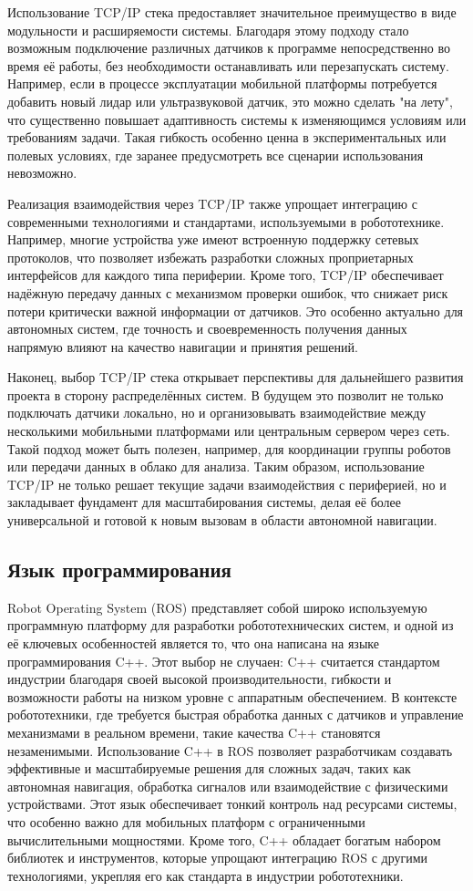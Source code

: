 Использование TCP/IP стека предоставляет значительное преимущество в виде
модульности и расширяемости системы. Благодаря этому подходу стало возможным
подключение различных датчиков к программе непосредственно во время её работы,
без необходимости останавливать или перезапускать систему. Например, если в
процессе эксплуатации мобильной платформы потребуется добавить новый лидар или
ультразвуковой датчик, это можно сделать "на лету", что существенно повышает
адаптивность системы к изменяющимся условиям или требованиям задачи. Такая
гибкость особенно ценна в экспериментальных или полевых условиях, где заранее
предусмотреть все сценарии использования невозможно.

Реализация взаимодействия через TCP/IP также упрощает интеграцию с современными
технологиями и стандартами, используемыми в робототехнике. Например, многие
устройства уже имеют встроенную поддержку сетевых протоколов, что позволяет
избежать разработки сложных проприетарных интерфейсов для каждого типа
периферии. Кроме того, TCP/IP обеспечивает надёжную передачу данных с механизмом
проверки ошибок, что снижает риск потери критически важной информации от
датчиков. Это особенно актуально для автономных систем, где точность и
своевременность получения данных напрямую влияют на качество навигации и
принятия решений.

Наконец, выбор TCP/IP стека открывает перспективы для дальнейшего развития
проекта в сторону распределённых систем. В будущем это позволит не только
подключать датчики локально, но и организовывать взаимодействие между
несколькими мобильными платформами или центральным сервером через сеть. Такой
подход может быть полезен, например, для координации группы роботов или передачи
данных в облако для анализа. Таким образом, использование TCP/IP не только
решает текущие задачи взаимодействия с периферией, но и закладывает фундамент
для масштабирования системы, делая её более универсальной и готовой к новым
вызовам в области автономной навигации.

\subsection{Язык программирования}
Robot Operating System (ROS) представляет собой широко используемую программную
платформу для разработки робототехнических систем, и одной из её ключевых
особенностей является то, что она написана на языке программирования C++. Этот
выбор не случаен: C++ считается стандартом индустрии благодаря своей высокой
производительности, гибкости и возможности работы на низком уровне с аппаратным
обеспечением. В контексте робототехники, где требуется быстрая обработка данных
с датчиков и управление механизмами в реальном времени, такие качества C++
становятся незаменимыми. Использование C++ в ROS позволяет разработчикам
создавать эффективные и масштабируемые решения для сложных задач, таких как
автономная навигация, обработка сигналов или взаимодействие с физическими
устройствами. Этот язык обеспечивает тонкий контроль над ресурсами системы, что
особенно важно для мобильных платформ с ограниченными вычислительными
мощностями. Кроме того, C++ обладает богатым набором библиотек и инструментов,
которые упрощают интеграцию ROS с другими технологиями, укрепляя его как
стандарта в индустрии робототехники.

